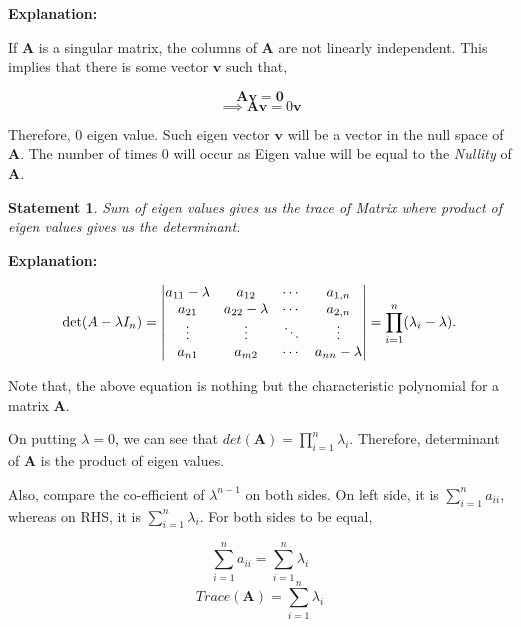 \documentclass[a4paper]{article}
\newtheorem{statement}{Statement}
\begin{document}
    \textbf{Explanation:}
    
    If $\mathbf{A}$ is a singular matrix, the columns of $\mathbf{A}$ are not linearly independent. This implies that there is some vector $\mathbf{v}$ such that,
    
    \begin{equation*}
        \mathbf{Av} = \mathbf{0}
    \end{equation*}
    \begin{equation*}
        \implies \mathbf{Av} = 0\mathbf{v}
    \end{equation*}
    
    Therefore, $0$ eigen value. Such eigen vector $\mathbf{v}$ will be a vector in the null space of $\mathbf{A}$. The number of times $0$ will occur as Eigen value will be equal to the \textit{Nullity} of $\mathbf{A}$.
    
    \begin{statement}
        Sum of eigen values gives us the trace of Matrix where product of eigen values gives us the determinant.
    \end{statement}
    
    \textbf{Explanation:}
    
    \begin{equation}
    \det(A-\lambda I_n) \\ 
    =\begin{vmatrix} 
    a_{1 1}- \lambda & a_{1 2} & \cdots & a_{1,n} \\ 
    a_{2 1} & a_{2 2} -\lambda & \cdots & a_{2,n} \\ 
    \vdots & \vdots & \ddots & \vdots \\ 
    a_{n 1} & a_{m 2} & \cdots & a_{n n}-\lambda 
    \end{vmatrix} =\prod_{i=1}^n (\lambda_i-\lambda).
    \end{equation}
    
    Note that, the above equation is nothing but the characteristic polynomial for a matrix $\mathbf{A}$.
    
    On putting $\lambda = 0$, we can see that $det(\mathbf{A}) = \prod_{i=1}^n{\lambda_i}$. Therefore, determinant of $\mathbf{A}$ is the product of eigen values.
    
    Also, compare the co-efficient of $\lambda^{n-1}$ on both sides. On left side, it is $\sum_{i=1}^n{a_{ii}}$, whereas on RHS, it is $\sum_{i=1}^n{\lambda_i}$. For both sides to be equal,
    
    \begin{equation*}
        \sum_{i=1}^n{a_{ii}} = \sum_{i=1}^n{\lambda_i}
    \end{equation*}
    \begin{equation*}
        Trace(\mathbf{A}) = \sum_{i=1}^n{\lambda_i}
    \end{equation*}
    
\end{document}
